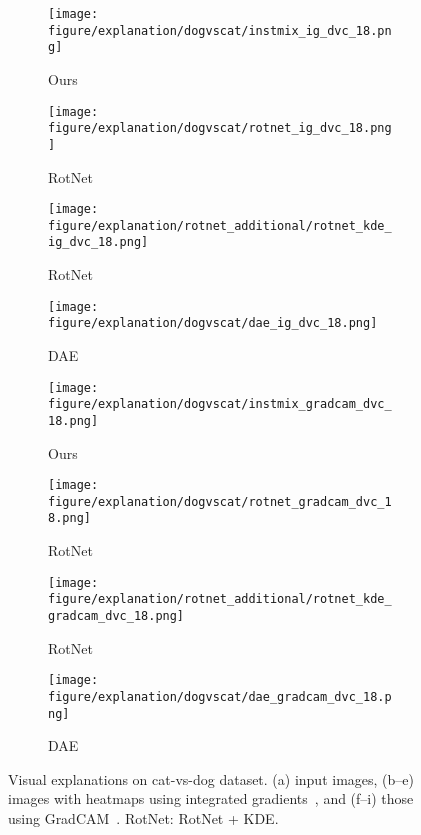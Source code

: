 \documentclass{article} \usepackage{iclr2021_conference,times}
\begin{document}
\begin{figure}[h!]
\begin{subfigure}{.11\textwidth}
  \centering
  \texttt{[image: figure/explanation/dogvscat/instmix\_ig\_dvc\_18.png]}
  \caption{Ours}
\end{subfigure}
\hspace{-2mm}
\begin{subfigure}{.11\textwidth}
  \centering
  \texttt{[image: figure/explanation/dogvscat/rotnet\_ig\_dvc\_18.png]}
  \caption{RotNet}
\end{subfigure}
\hspace{-2mm}
\begin{subfigure}{.11\textwidth}
  \centering
  \texttt{[image: figure/explanation/rotnet\_additional/rotnet\_kde\_ig\_dvc\_18.png]}
  \caption{RotNet}
\end{subfigure}
\hspace{-2mm}
\begin{subfigure}{.11\textwidth}
  \centering
  \texttt{[image: figure/explanation/dogvscat/dae\_ig\_dvc\_18.png]}
  \caption{DAE}
\end{subfigure}
\hspace{-2mm}
\begin{subfigure}{.11\textwidth}
  \centering
  \texttt{[image: figure/explanation/dogvscat/instmix\_gradcam\_dvc\_18.png]}
  \caption{Ours}
\end{subfigure}
\hspace{-2mm}
\begin{subfigure}{.11\textwidth}
  \centering
  \texttt{[image: figure/explanation/dogvscat/rotnet\_gradcam\_dvc\_18.png]}
  \caption{RotNet}
\end{subfigure}
\hspace{-2mm}
\begin{subfigure}{.11\textwidth}
  \centering
  \texttt{[image: figure/explanation/rotnet\_additional/rotnet\_kde\_gradcam\_dvc\_18.png]}
  \caption{RotNet}
\end{subfigure}
\hspace{-2mm}
\begin{subfigure}{.11\textwidth}
  \centering
  \texttt{[image: figure/explanation/dogvscat/dae\_gradcam\_dvc\_18.png]}
  \caption{DAE}
\end{subfigure}
\caption{Visual explanations on cat-vs-dog dataset. (a) input images, (b--e) images with heatmaps using integrated gradients~\citep{sundararajan2017axiomatic}, and (f--i) those using GradCAM~\citep{selvaraju2017grad}. RotNet: RotNet + KDE.}
\label{fig:visual_explanation_cvd_2}
\end{figure}
\end{document}
